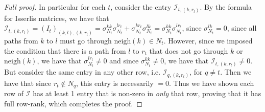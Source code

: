 \documentclass{article}
\theoremstyle{definition}
\newcommand{\neigh}[1]{\text{neigh}(#1)}
\newcommand{\I}{\mathcal{I}}
\begin{document}
\begin{proof}[Full proof]
In particular for each $t$, consider the entry $\I_{t, (k, r_t)}$. By the formula for Isserlis matrices, we have that $\I_{t, (k,r_t)} = (I_t)_{(k,l), (k, r_t)} = \sigma_{N_t}^{kk}\sigma_{N_t}^{lr_t} + \sigma_{N_t}^{kr_t}\sigma_{N_t}^{lk} = \sigma_{N_t}^{kk}\sigma_{N_t}^{lr_t}$, since $\sigma_{N_t}^{lk} = 0$, since all paths from $k$ to $l$ must go through $\neigh{k} \in N_t$. However, since we imposed the condition that there is a path from $l$ to $r_t$ that does not go through $k$ or $\neigh{k}$, we have that $\sigma_{N_t}^{lr_t} \neq 0$ and since $\sigma_{N_t}^{kk} \neq 0$, we have that $\I_{t, (k, r_t)} \neq 0$. But consider the same entry in any other row, i.e. $\I_{q, (k, r_t)}$, for $q \neq t$. Then we have that since $r_t \not \in N_q$, this entry is necessarily $=0$. Thus we have shown each row of $\I$ has at least 1 entry that is non-zero in \emph{only} that row, proving that it has full row-rank, which completes the proof.

\end{proof}
\end{document}
